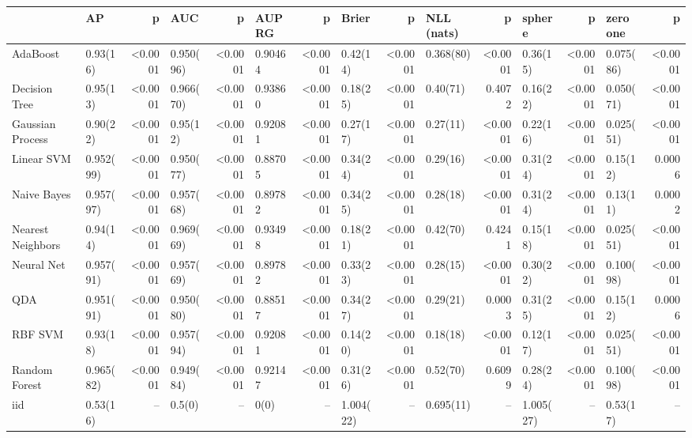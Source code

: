\documentclass{article}
\begin{document}
\begin{center}
{\tiny
\setlength{\tabcolsep}{0.75em} %
\begin{tabular}{|l|l|r|l|r|l|r|l|r|l|r|l|r|l|r|}
\toprule
{}                &       {AP} &      {p} &      {AUC} &      {p} &  {AUPRG} &      {p} &    {Brier} &      {p} & {NLL (nats)} &      {p} &   {sphere} &      {p} & {zero one} &      {p} \\
\midrule
AdaBoost          &  0.93(16)  &  <0.0001 &  0.950(96) &  <0.0001 &  0.90464 &  <0.0001 &  0.42(14)  &  <0.0001 &    0.368(80) &  <0.0001 &  0.36(15)  &  <0.0001 &  0.075(86) &  <0.0001 \\
Decision Tree     &  0.95(13)  &  <0.0001 &  0.966(70) &  <0.0001 &  0.93860 &  <0.0001 &  0.18(25)  &  <0.0001 &    0.40(71)  &   0.4072 &  0.16(22)  &  <0.0001 &  0.050(71) &  <0.0001 \\
Gaussian Process  &  0.90(22)  &  <0.0001 &  0.95(12)  &  <0.0001 &  0.92081 &  <0.0001 &  0.27(17)  &  <0.0001 &    0.27(11)  &  <0.0001 &  0.22(16)  &  <0.0001 &  0.025(51) &  <0.0001 \\
Linear SVM        &  0.952(99) &  <0.0001 &  0.950(77) &  <0.0001 &  0.88705 &  <0.0001 &  0.34(24)  &  <0.0001 &    0.29(16)  &  <0.0001 &  0.31(24)  &  <0.0001 &  0.15(12)  &   0.0006 \\
Naive Bayes       &  0.957(97) &  <0.0001 &  0.957(68) &  <0.0001 &  0.89782 &  <0.0001 &  0.34(25)  &  <0.0001 &    0.28(18)  &  <0.0001 &  0.31(24)  &  <0.0001 &  0.13(11)  &   0.0002 \\
Nearest Neighbors &  0.94(14)  &  <0.0001 &  0.969(69) &  <0.0001 &  0.93498 &  <0.0001 &  0.18(21)  &  <0.0001 &    0.42(70)  &   0.4241 &  0.15(18)  &  <0.0001 &  0.025(51) &  <0.0001 \\
Neural Net        &  0.957(91) &  <0.0001 &  0.957(69) &  <0.0001 &  0.89782 &  <0.0001 &  0.33(23)  &  <0.0001 &    0.28(15)  &  <0.0001 &  0.30(22)  &  <0.0001 &  0.100(98) &  <0.0001 \\
QDA               &  0.951(91) &  <0.0001 &  0.950(80) &  <0.0001 &  0.88517 &  <0.0001 &  0.34(27)  &  <0.0001 &    0.29(21)  &   0.0003 &  0.31(25)  &  <0.0001 &  0.15(12)  &   0.0006 \\
RBF SVM           &  0.93(18)  &  <0.0001 &  0.957(94) &  <0.0001 &  0.92081 &  <0.0001 &  0.14(20)  &  <0.0001 &    0.18(18)  &  <0.0001 &  0.12(17)  &  <0.0001 &  0.025(51) &  <0.0001 \\
Random Forest     &  0.965(82) &  <0.0001 &  0.949(84) &  <0.0001 &  0.92147 &  <0.0001 &  0.31(26)  &  <0.0001 &    0.52(70)  &   0.6099 &  0.28(24)  &  <0.0001 &  0.100(98) &  <0.0001 \\
iid               &  0.53(16)  &     {--} &  0.5(0)    &     {--} &  0(0)    &     {--} &  1.004(22) &     {--} &    0.695(11) &     {--} &  1.005(27) &     {--} &  0.53(17)  &     {--} \\
\bottomrule
\end{tabular}
}
\end{center}
\end{document}
